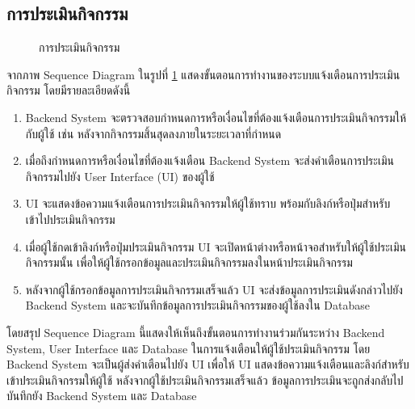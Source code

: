 \documentclass[14pt,oneside,openright,a4paper]{cpe-thai-project}
\begin{document}
\subsection{การประเมินกิจกรรม}

  \begin{figure}[!h]\centering
    \setlength{\fboxrule}{0.5mm} %
    \setlength{\fboxsep}{0.5cm}
    \caption{การประเมินกิจกรรม}\label{fig:Event evaluation}
  \end{figure}

  จากภาพ Sequence Diagram ในรูปที่ \ref{fig:Event evaluation} แสดงขั้นตอนการทำงานของระบบแจ้งเตือนการประเมินกิจกรรม โดยมีรายละเอียดดังนี้
  \begin{enumerate}
    \item Backend System จะตรวจสอบกำหนดการหรือเงื่อนไขที่ต้องแจ้งเตือนการประเมินกิจกรรมให้กับผู้ใช้ เช่น หลังจากกิจกรรมสิ้นสุดลงภายในระยะเวลาที่กำหนด
    \item เมื่อถึงกำหนดการหรือเงื่อนไขที่ต้องแจ้งเตือน Backend System จะส่งคำเตือนการประเมินกิจกรรมไปยัง User Interface (UI) ของผู้ใช้
    \item UI จะแสดงข้อความแจ้งเตือนการประเมินกิจกรรมให้ผู้ใช้ทราบ พร้อมกับลิงก์หรือปุ่มสำหรับเข้าไปประเมินกิจกรรม
    \item เมื่อผู้ใช้กดเข้าลิงก์หรือปุ่มประเมินกิจกรรม UI จะเปิดหน้าต่างหรือหน้าจอสำหรับให้ผู้ใช้ประเมินกิจกรรมนั้น เพื่อให้ผู้ใช้กรอกข้อมูลและประเมินกิจกรรมลงในหน้าประเมินกิจกรรม
    \item หลังจากผู้ใช้กรอกข้อมูลการประเมินกิจกรรมเสร็จแล้ว UI จะส่งข้อมูลการประเมินดังกล่าวไปยัง Backend System และจะบันทึกข้อมูลการประเมินกิจกรรมของผู้ใช้ลงใน Database
  \end{enumerate}
  โดยสรุป Sequence Diagram นี้แสดงให้เห็นถึงขั้นตอนการทำงานร่วมกันระหว่าง Backend System, User Interface และ Database ในการแจ้งเตือนให้ผู้ใช้ประเมินกิจกรรม โดย Backend System จะเป็นผู้ส่งคำเตือนไปยัง UI เพื่อให้ UI แสดงข้อความแจ้งเตือนและลิงก์สำหรับเข้าประเมินกิจกรรมให้ผู้ใช้ หลังจากผู้ใช้ประเมินกิจกรรมเสร็จแล้ว ข้อมูลการประเมินจะถูกส่งกลับไปบันทึกยัง Backend System และ Database
\end{document}
